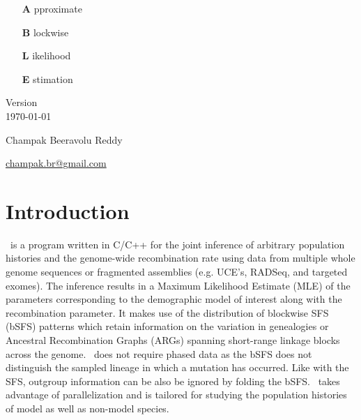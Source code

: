 \documentclass[pdftex,12pt]{article}
\newcommand{\incode}[1]{\tcbox[colback=blue!10!gray!10, colframe=blue!10!gray!40, boxrule=0.5pt, on line, size=fbox]{\texttt{\detokenize{#1}}}}
\newcommand{\ABLE}{\incode{ABLE}}
\newcommand{\RED}[1]{\textcolor{red}{\detokenize{#1}}}
\begin{document}
\begin{titlepage}
\centering
\vspace*{\fill}

\begin{center}
\begin{adjustwidth}{2.3in}{0in}
	\begin{itemize}
		\item [{\Huge \textbf{A}}] pproximate
		\item [{\Huge \textbf{B}}] lockwise
		\item [{\Huge \textbf{L}}] ikelihood
		\item [{\Huge \textbf{E}}] stimation
	\end{itemize}
\end{adjustwidth}
\end{center}

\vspace{1cm}

Version \RED{xyz} \\
\today

\vspace{2cm}

{\large Champak Beeravolu Reddy}

\href{mailto:champak.br@gmail.com}{champak.br@gmail.com}

\vspace*{\fill}
\end{titlepage}

\vspace*{5cm}
\tableofcontents
\vspace*{\fill}

\clearpage


\section{Introduction}
\ABLE\ is a program written in C/C++ for the joint inference of arbitrary population histories and the genome-wide recombination rate using data from multiple whole genome sequences or fragmented assemblies (e.g. UCE's, RADSeq, and targeted exomes). The inference results in a Maximum Likelihood Estimate (MLE) of the parameters corresponding to the demographic model of interest along with the recombination parameter. It makes use of the distribution of blockwise SFS (bSFS) patterns which retain information on the variation in genealogies or Ancestral Recombination Graphs (ARGs) spanning short-range linkage blocks across the genome. \ABLE\ does not require phased data as the bSFS does not distinguish the sampled lineage in which a mutation has occurred. Like with the SFS, outgroup information can be also be ignored by folding the bSFS. \ABLE\ takes advantage of \incode{openmp} parallelization and is tailored for studying the population histories of model as well as non-model species.
\end{document}

